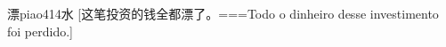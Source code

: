 \begin{EntryWithPhonetic}{漂}{piao4}{14}{⽔}
  [这笔投资的钱全都漂了。===Todo o dinheiro desse investimento foi perdido.]
\end{EntryWithPhonetic}
